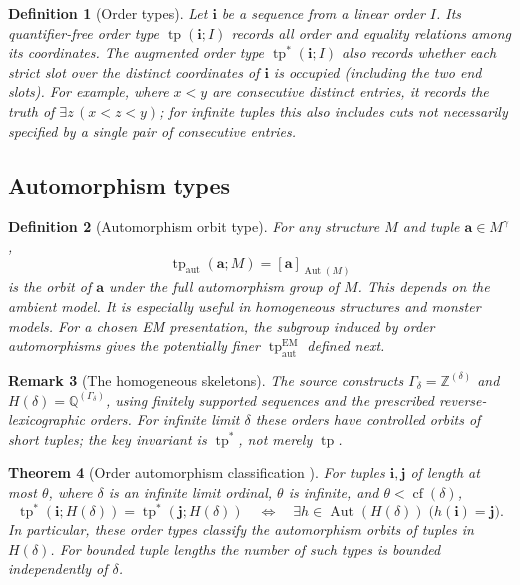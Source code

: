 \documentclass[11pt]{article}
\newcommand{\auttp}{\operatorname{tp}_{\mathrm{aut}}}
\newcommand{\EMauttp}{\operatorname{tp}^{\mathrm{EM}}_{\mathrm{aut}}}
\newcommand{\tpstar}{\operatorname{tp}^{*}}
\newcommand{\ba}{\mathbf{a}}
\newcommand{\bi}{\mathbf{i}}
\newcommand{\bj}{\mathbf{j}}
\theoremstyle{plain}
\newtheorem{definition}{Definition}[section]
\newtheorem{theorem}[definition]{Theorem}
\newtheorem{remark}[definition]{Remark}
\begin{document}
\begin{definition}[Order types]\label{def:ordtypes}
Let $\bi$ be a sequence from a linear order $I$.
Its \emph{quantifier-free order type}
$\operatorname{tp}(\bi;I)$ records all order and
equality relations among its coordinates.
The augmented order type
$\tpstar(\bi;I)$ also records whether each
strict slot over the distinct coordinates
of $\bi$ is occupied (including the two end slots).
For example, where $x<y$ are consecutive
distinct entries, it records the truth of
$\exists z\,(x<z<y)$; for infinite tuples this
also includes cuts not necessarily specified by
a single pair of consecutive entries.
\end{definition}

\subsection{Automorphism types}\label{subsec:auto}
\begin{definition}[Automorphism orbit type]
For any structure $M$ and tuple $\ba\in M^\gamma$,
\[
\auttp(\ba;M)=[\ba]_{\operatorname{Aut}(M)}
\]
is the orbit of $\ba$ under the full automorphism
group of $M$. This depends on the ambient model.
It is especially useful in homogeneous structures
and monster models. For a chosen EM presentation,
the subgroup induced by order automorphisms gives
the potentially finer $\EMauttp$ defined next.
\end{definition}

\begin{remark}[The homogeneous skeletons]
The source constructs
$\Gamma_\delta=\mathbb Z^{(\delta)}$ and
$H(\delta)=\mathbb Q^{(\Gamma_\delta)}$,
using finitely supported sequences and the prescribed
reverse-lexicographic orders. For infinite limit
$\delta$ these orders have controlled orbits of
short tuples; the key invariant is $\tpstar$,
not merely $\operatorname{tp}$.
\end{remark}

\begin{theorem}[Order automorphism classification {\cite[Theorem 3.5]{oai-ecc}}]\label{thm:order-orbits} For tuples $\bi,\bj$ of length at most $\theta$, where
$\delta$ is an infinite limit ordinal,
$\theta$ is infinite, and $\theta<\operatorname{cf}(\delta)$,
\[
\tpstar(\bi;H(\delta))
=\tpstar(\bj;H(\delta))
\quad\Longleftrightarrow\quad
\exists h\in\operatorname{Aut}(H(\delta))\;
\bigl(h(\bi)=\bj\bigr).
\]
In particular, these order types classify the automorphism orbits of
tuples in $H(\delta)$. For bounded tuple lengths the number of such types
is bounded independently of $\delta$.
\end{theorem}
\end{document}
